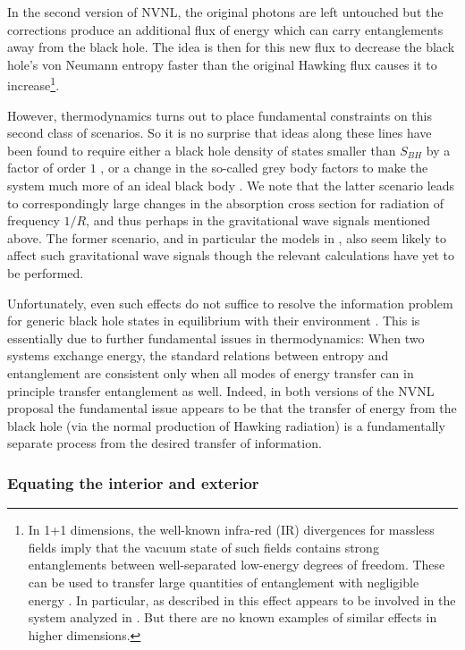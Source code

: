 \documentclass[10pt]{article}
\begin{document}
In the second version of NVNL, the original photons are left untouched but the corrections produce an additional flux of energy which can carry entanglements away from the black hole.  The idea is then for this new flux to decrease the black hole's von Neumann entropy faster than the original Hawking flux causes it to increase\footnote{In 1+1 dimensions, the well-known infra-red (IR) divergences for massless fields imply that the vacuum state of such fields contains strong entanglements between well-separated low-energy degrees of freedom.  These can be used to transfer large quantities of entanglement with negligible energy \cite{Wilczek1992,Hotta:2015yla}. In particular, as described in \cite{Almheiri:2013wka} this effect appears to be involved in the system analyzed in \cite{Ashtekar:2008jd,Ashtekar:2010hx,Ashtekar:2010qz}. But there are no known examples of similar effects in higher dimensions.  }.

However, thermodynamics turns out to place fundamental constraints \cite{Almheiri:2013hfa} on this second class of scenarios.  So it is no surprise that ideas along these lines have been found to require either a black hole density of states smaller than $S_{BH}$ by a factor of order $1$ \cite{Giddings:2013vda}, or a change in the so-called grey body factors to make the system much more of an ideal black body \cite{Giddings:2015uzr}.  We note that the latter scenario leads to correspondingly large changes in the absorption cross section for radiation of frequency $1/R$, and thus perhaps in the gravitational wave signals mentioned above.  The former scenario, and in particular the models in \cite{Giddings:2017mym}, also seem likely to affect such gravitational wave signals though the relevant calculations have yet to be performed.

Unfortunately, even such effects do not suffice to resolve the information problem for generic black hole states in equilibrium with their environment \cite{Almheiri:2013hfa}.  This is essentially due to further fundamental issues in thermodynamics:  When two systems exchange energy, the standard relations between entropy and entanglement are consistent only when all modes of energy transfer can in principle transfer entanglement as well. Indeed, in both versions of the NVNL proposal the fundamental issue appears to be that the transfer of energy from the black hole (via the normal production of Hawking radiation) is a fundamentally separate process from the desired transfer of information.

\subsubsection{Equating the interior and exterior}
\end{document}
